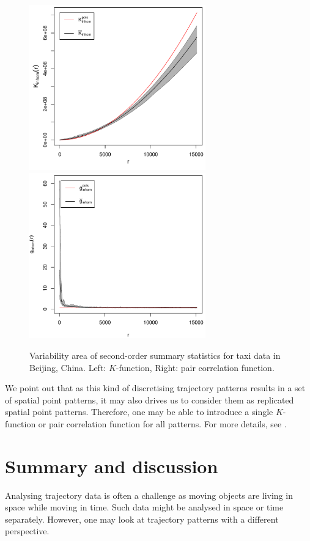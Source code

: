 \documentclass[article]{jss}
\begin{document}
  \begin{figure}[!h]
  \centering
  \includegraphics[width = 3in]{Kfun}
  \includegraphics[width = 3in]{gfun}
  \caption{Variability area of second-order summary statistics for taxi data in Beijing, China. Left: $K$-function, Right: pair correlation function.}
  \label{Kgvariation}
  \end{figure}

  We point out that as this kind of discretising trajectory patterns results in a set of spatial point patterns, it may also drives us to consider them as replicated spatial point patterns. Therefore, one may be able to introduce a single $K$-function or pair correlation function for all patterns. For more details, see \cite[Section 5.4]{D13}.
  
 \section{Summary and discussion} \label{sec:summary}
  Analysing trajectory data is often a challenge as moving objects are living in space while moving in time. Such data might be analysed in space or time separately. However, one may look at trajectory patterns with a different perspective. 
  
\end{document}
